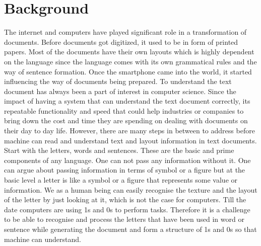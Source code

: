 \chapter{Background}

\large  The internet and computers have played significant role in a transformation of documents. Before documents got digitized, it used to be in form of printed papers. Most of the documents have their own layouts which is highly dependent on the language since the language comes with its own grammatical rules and the way of sentence formation. Once the smartphone came into the world, it started influencing the way of documents being prepared. To understand the text document has always been a part of interest in computer science. Since the impact of having a system that can understand the text document correctly, its repeatable functionality and speed that could help industries or companies to bring down the cost and time they are spending on dealing with documents on their day to day life. However, there are many steps in between to address before machine can read and understand text and layout information in text documents. Start with the letters, words and sentences. These are the basic and prime components of any language. One can not pass any information without it. One can argue about passing information in terms of symbol or a figure but at the basic level a letter is like a symbol or a figure that represents some value or information. We as a human being can easily recognise the texture and the layout of the letter by just looking at it, which is not the case for computers. Till the date computers are using 1s and 0s to perform tasks. Therefore it is a challenge to be able to recognise and process the letters that have been used in word or sentence while generating the document and form a structure of 1s and 0s so that machine can understand. 

















